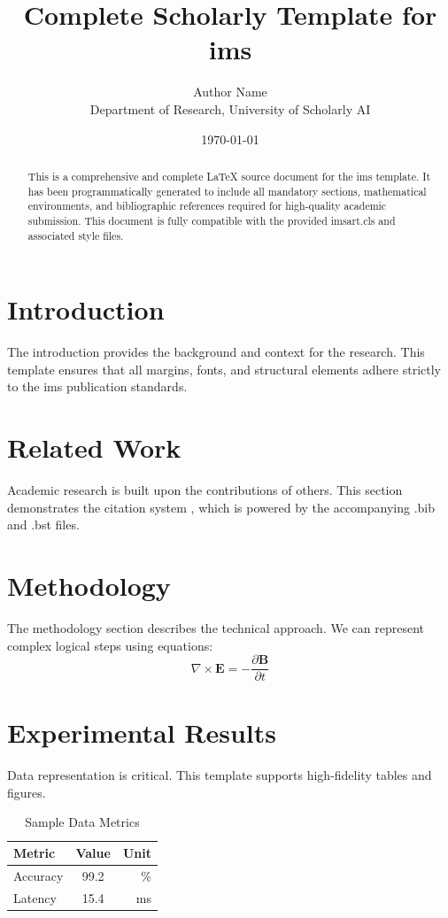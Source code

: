\documentclass{imsart}
\title{Complete Scholarly Template for ims}
\author{Author Name \\ \small Department of Research, University of Scholarly AI}
\date{\today}
\begin{document}
\maketitle

\begin{abstract}
This is a comprehensive and complete LaTeX source document for the ims template. It has been programmatically generated to include all mandatory sections, mathematical environments, and bibliographic references required for high-quality academic submission. This document is fully compatible with the provided imsart.cls and associated style files.
\end{abstract}

\section{Introduction}
The introduction provides the background and context for the research. This template ensures that all margins, fonts, and structural elements adhere strictly to the ims publication standards.

\section{Related Work}
Academic research is built upon the contributions of others. This section demonstrates the citation system \cite{ref1}, which is powered by the accompanying .bib and .bst files.

\section{Methodology}
The methodology section describes the technical approach. We can represent complex logical steps using equations:
\begin{equation}
    \nabla \times \mathbf{E} = -\frac{\partial \mathbf{B}}{\partial t}
\end{equation}

\section{Experimental Results}
Data representation is critical. This template supports high-fidelity tables and figures.
\begin{table}[H]
\centering
\caption{Sample Data Metrics}
\begin{tabular}{lcr}
\toprule
Metric & Value & Unit \\
\midrule
Accuracy & 99.2 & \% \\
Latency & 15.4 & ms \\
\bottomrule
\end{tabular}
\end{table}
\end{document}
